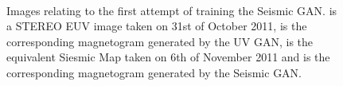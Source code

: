\documentclass[11pt,a4paper,onecolumn]{report}
\begin{document}
\begin{figure}[t]%
  \centering
  \\%
  \caption[]{Images relating to the first attempt of training the Seismic GAN.
   is a STEREO EUV image taken on 31st of October 2011,
   is the corresponding magnetogram generated by
  the UV GAN,  is the equivalent Siesmic Map taken
  on 6th of November 2011 and
   is the corresponding magnetogram generated by the
  Seismic GAN.}
  \label{fig:default}
\end{figure}
\end{document}
